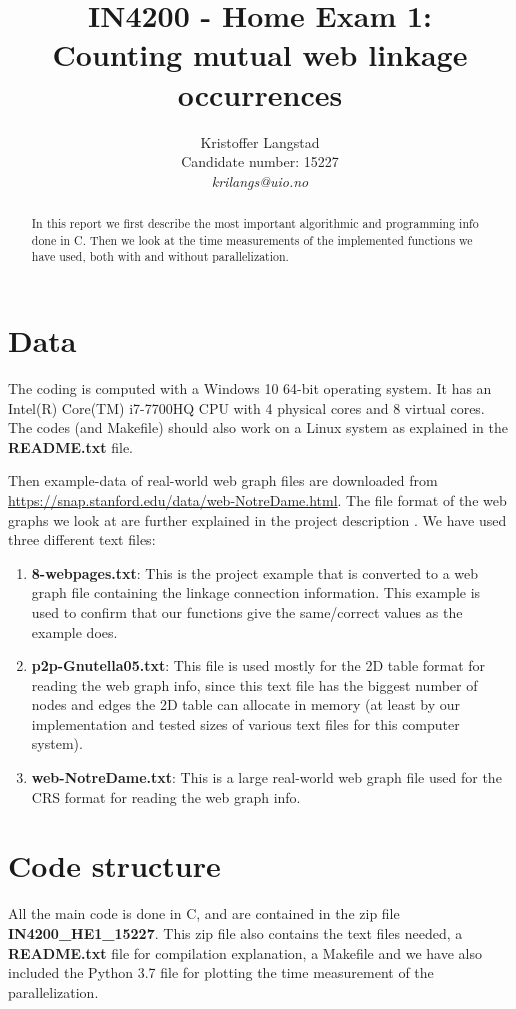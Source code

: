 \documentclass[12pt,a4paper,english]{article}
\title{IN4200 - Home Exam 1:\\ Counting mutual web linkage occurrences}
\date{}
\author{ Kristoffer Langstad\\ Candidate number: 15227\\ \textit{krilangs@uio.no}}
\begin{document}
\maketitle
\begin{abstract}
	In this report we first describe the most important algorithmic and programming info done in C. Then we look at the time measurements of the implemented functions we have used, both with and without parallelization.
\end{abstract}

\section{Data}
\label{sect:Data}
The coding is computed with a Windows 10 64-bit operating system. It has an Intel(R) Core(TM) i7-7700HQ CPU with 4 physical cores and 8 virtual cores. The codes (and Makefile) should also work on a Linux system as explained in the \textbf{README.txt} file.

Then example-data of real-world web graph files are downloaded from \url{https://snap.stanford.edu/data/web-NotreDame.html}. The file format of the web graphs we look at are further explained in the project description \cite{IN4200}. We have used three different text files:
\begin{enumerate}
	\item \textbf{8-webpages.txt}: This is the project example that is converted to a web graph file containing the linkage connection information. This example is used to confirm that our functions give the same/correct values as the example does.
	\item \textbf{p2p-Gnutella05.txt}: This file is used mostly for the 2D table format for reading the web graph info, since this text file has the biggest number of nodes and edges the 2D table can allocate in memory (at least by our implementation and tested sizes of various text files for this computer system).
	\item \textbf{web-NotreDame.txt}: This is a large real-world web graph file used for the CRS format for reading the web graph info.
\end{enumerate} 

\section{Code structure}
\label{sect:Code_struct}
All the main code is done in C, and are contained in the zip file \textbf{IN4200\_HE1\_15227}. This zip file also contains the text files needed, a \textbf{README.txt} file for compilation explanation, a Makefile and we have also included the Python 3.7 file for plotting the time measurement of the parallelization.
\end{document}
